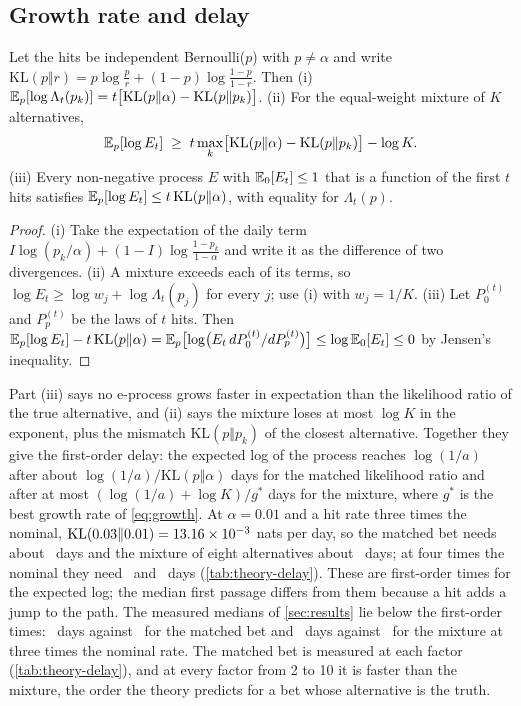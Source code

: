

\subsection{Growth rate and delay}
\label{sec:theory-growth}

\begin{proposition}
\label{prop:growth}
Let the hits be independent Bernoulli($p$) with $p\ne\alpha$ and write $\mathrm{KL}(p\Vert r)=p\log\frac pr+(1-p)\log\frac{1-p}{1-r}$. Then (i) $\mathbb{E}_p[\log\Lambda_t(p_k)]=t\bigl[\mathrm{KL}(p\Vert\alpha)-\mathrm{KL}(p\Vert p_k)\bigr]$. (ii) For the equal-weight mixture of $K$ alternatives,
\begin{equation}
\mathbb{E}_p[\log E_t]\;\ge\;t\max_k\bigl[\mathrm{KL}(p\Vert\alpha)-\mathrm{KL}(p\Vert p_k)\bigr]-\log K .
\label{eq:growth}
\end{equation}
(iii) Every non-negative process $E$ with $\mathbb{E}_0[E_t]\le1$ that is a function of the first $t$ hits satisfies $\mathbb{E}_p[\log E_t]\le t\,\mathrm{KL}(p\Vert\alpha)$, with equality for $\Lambda_t(p)$.
\end{proposition}
\begin{proof}
(i) Take the expectation of the daily term $I\log(p_k/\alpha)+(1-I)\log\frac{1-p_k}{1-\alpha}$ and write it as the difference of two divergences. (ii) A mixture exceeds each of its terms, so $\log E_t\ge\log w_j+\log\Lambda_t(p_j)$ for every $j$; use (i) with $w_j=1/K$.
(iii) Let $P_0^{(t)}$ and $P_p^{(t)}$ be the laws of $t$ hits. Then $\mathbb{E}_p[\log E_t]-t\,\mathrm{KL}(p\Vert\alpha)=\mathbb{E}_p\bigl[\log\bigl(E_t\,dP_0^{(t)}/dP_p^{(t)}\bigr)\bigr]\le\log\mathbb{E}_0[E_t]\le0$ by Jensen's inequality.
\end{proof}

Part (iii) says no e-process grows faster in expectation than the likelihood ratio of the true alternative, and (ii) says the mixture loses at most $\log K$ in the exponent, plus the mismatch $\mathrm{KL}(p\Vert p_k)$ of the closest alternative.
Together they give the first-order delay: the expected log of the process reaches $\log(1/a)$ after about $\log(1/a)/\mathrm{KL}(p\Vert\alpha)$ days for the matched likelihood ratio and after at most $(\log(1/a)+\log K)/g^\ast$ days for the mixture, where $g^\ast$ is the best growth rate of \cref{eq:growth}.
At $\alpha=0.01$ and a hit rate three times the nominal, $\mathrm{KL}(0.03\Vert0.01)=13.16\times10^{-3}$ nats per day, so the matched bet needs about \nKlSprtThree\ days and the mixture of eight alternatives about \nKlMixThree\ days; at four times the nominal they need \nKlSprtFour\ and \nKlMixFour\ days
(\cref{tab:theory-delay}). These are first-order times for the expected log; the median first passage differs from them because a hit adds a jump to the path. The measured medians of \cref{sec:results} lie below the first-order times: \nMatchedThreeMed\ days against \nKlSprtThree\ for the matched bet and \nMedThreeE\ days against \nKlMixThree\ for the mixture at three times the nominal rate. The matched bet is measured at each factor (\cref{tab:theory-delay}), and at every factor from 2 to 10 it is faster than the mixture, the order the theory predicts for a bet whose alternative is the truth.


